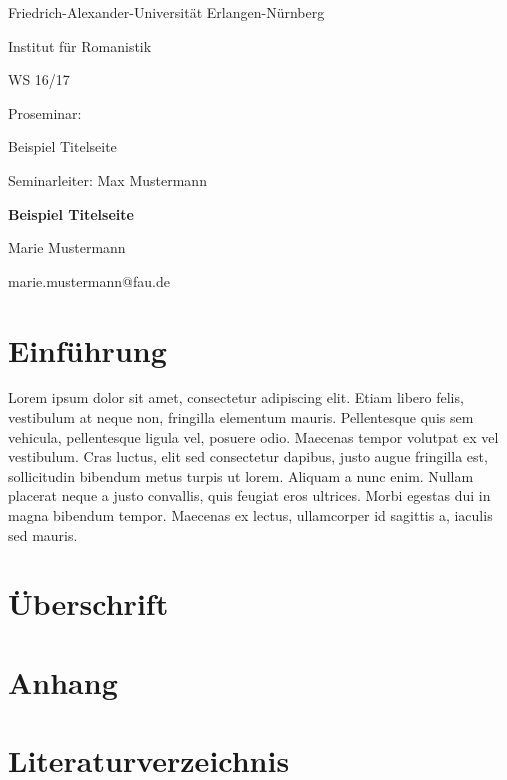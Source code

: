 \documentclass[12pt, a4paper]{article}
\begin{document}
\nocite{*} %

\begin{titlepage}
  \begin{center}
    Friedrich-Alexander-Universität Erlangen-Nürnberg

    Institut für Romanistik

    WS 16/17

    \vspace{1cm}
    Proseminar:

    Beispiel Titelseite

    Seminarleiter: Max Mustermann
    \vspace{3cm}

    \Large \textbf{Beispiel Titelseite}

    \vspace{1cm}
    \small{Marie Mustermann}

    \small{marie.mustermann@fau.de}
    \vspace{1cm}
  \end{center}
\end{titlepage}

\tableofcontents
\thispagestyle{empty}
\pagestyle{empty}



\newpage
\onehalfspacing

\section{Einführung}
Lorem ipsum dolor sit amet, consectetur adipiscing elit. Etiam libero felis, vestibulum at neque non, fringilla elementum mauris. Pellentesque quis sem vehicula, pellentesque ligula vel, posuere odio. Maecenas tempor volutpat ex vel vestibulum. Cras luctus, elit sed consectetur dapibus, justo augue fringilla est, sollicitudin bibendum metus turpis ut lorem. Aliquam a nunc enim. Nullam placerat neque a justo convallis, quis feugiat eros ultrices. Morbi egestas dui in magna bibendum tempor. Maecenas ex lectus, ullamcorper id sagittis a, iaculis sed mauris.

\section{Überschrift}

\newpage
\section{Anhang}
\newpage


\section*{Literaturverzeichnis}
\renewcommand{\section}[2]{} %



\end{document}

